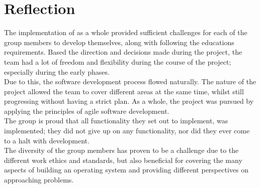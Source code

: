 \section{Reflection}
The implementation of \OSname{} as a whole provided sufficient challenges
for each of the group members to develop themselves, along with following
the education\textquotesingle s requirements.
Based the direction and decisions made during the project,
the team had a lot of freedom and flexibility during the 
course of the project; especially during the early phases.
\\
Due to this, the software development process flowed naturally. 
The nature of the project allowed the team to cover different 
areas at the same time, whilst still progressing without 
having a strict plan. 
As a whole, the project was pursued by applying the principles 
of agile software development.
\\
The group is proud that all functionality they set out to 
implement, was implemented; they did not give up on any 
functionality, nor did they ever come to a halt with development.
\\
The diversity of the group members has proven to be a challenge 
due to the different work ethics and standards,
but also beneficial for covering the many aspects of building 
an operating system and providing different perspectives on 
approaching problems.